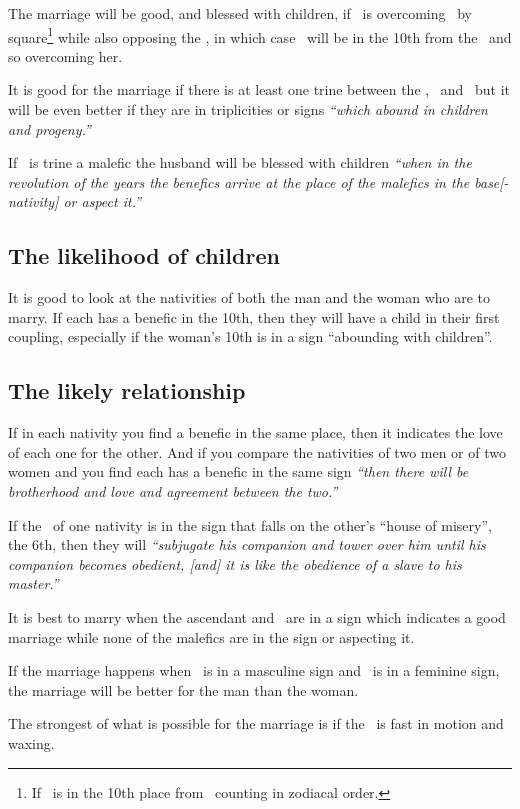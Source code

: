 The marriage will be good, and blessed with children, if \Jupiter\, is overcoming \Venus\, by square\footnote{If \Jupiter\, is in the 10th place from \Venus\, counting in zodiacal order.} while also opposing the \Moon, in which case \Venus\, will be in the 10th from the \Moon\, and so overcoming her.

It is good for the marriage if there is at least one trine between the \Moon, \Venus\, and \Jupiter\, but it will be even better if they are in triplicities or signs \textsl{``which abound in children and progeny.''}

If \Venus\, is trine a malefic the husband will be blessed with children \textsl{``when in the revolution of the years the benefics arrive at the place of the malefics in the base[-nativity] or aspect it.''}

\subsection{The likelihood of children}
It is good to look at the nativities of both the man and the woman who are to marry. If each has a benefic in the 10th, then they will have a child in their first coupling, especially if the woman's 10th is in a sign ``abounding with children''.

\subsection{The likely relationship}
If in each nativity you find a benefic in the same place, then it indicates the love of each one for the other. And if you compare the nativities of two men or of two women and you find each has a benefic in the same sign \textsl{``then there will be brotherhood and love and agreement between the two.''}

If the \Moon\, of one nativity is in the sign that falls on the other's ``house of misery'', the 6th, then they will \textsl{``subjugate his companion and tower over him until his companion becomes obedient, [and] it is like the obedience of a slave to his master.''}

It is best to marry when the ascendant and \Moon\, are in a sign which indicates a good marriage while none of the malefics are in the sign or aspecting it.

If the marriage happens when \Venus\, is in a masculine sign and \Jupiter\, is in a feminine sign, the marriage will be better for the man than the woman.

The strongest of what is possible for the marriage is if the \Moon\, is fast in motion and waxing.

